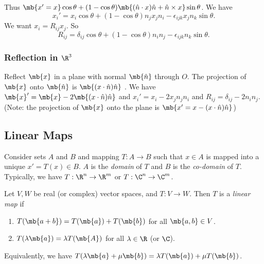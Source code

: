 \documentclass[a4paper]{article}
\begin{document}
Thus $\mb{x' = x}\cos\theta + (1 - \cos\theta)\mb{(\hat{n}\cdot x)\hat{n} + \hat{n}\times x}\sin\theta$. We have
\[
x_i' = x_i\cos\theta + (1 - \cos\theta)n_jx_jn_i - \epsilon_{ijk}x_jn_k\sin\theta.
\]
We want $x_i = R_{ij}x_j$. So
\[
R_{ij} = \delta_{ij}\cos\theta + (1 - \cos\theta)n_in_j - \epsilon_{ijk}n_k\sin\theta.
\]

\subsubsection{Reflection in \texorpdfstring{$\R^3$}{R3}}
Reflect $\mb{x}$ in a plane with normal $\mb{\hat{n}}$ through $O$. The projection of $\mb{x}$ onto $\mb{\hat{n}}$ is $\mb{(x\cdot \hat{n})\hat{n}}$ . We have $\mb{x}' = \mb{x} - 2\mb{(x\cdot \hat{n})\hat{n}}$ and $x_i' = x_i - 2x_jn_jn_i$ and $R_{ij} = \delta_{ij} - 2n_in_j$.(Note: the projection  of $\mb{x}$ onto the plane is $\mb{x' = x - (x\cdot \hat{n})\hat{n}}$)

\begin{center}
\end{center}

\subsection{Linear Maps}
\begin{defi}
  Consider sets $A$ and $B$ and mapping $T:A\to B$ such that $x\in A$ is mapped into a unique $x' = T(x)\in B$. $A$ is the \emph{domain} of $T$ and $B$ is the \emph{co-domain} of $T$. Typically, we have $T:\R^n \to \R^m$ or $T:\C^n\to \C^m$.
\end{defi}

\begin{defi}
  Let $V, W$ be real (or complex) vector spaces, and $T: V\to W$. Then $T$ is a \emph{linear map} if
  \begin{enumerate}
    \item $T(\mb{a + b}) = T(\mb{a}) + T(\mb{b})$ for all $\mb{a, b}\in V$.
    \item $T(\lambda\mb{a}) = \lambda T(\mb{A})$ for all $\lambda \in \R$ (or $\C$).
  \end{enumerate}
  Equivalently, we have $T(\lambda\mb{a} + \mu\mb{b}) = \lambda T(\mb{a}) + \mu T(\mb{b})$.
\end{defi}
\end{document}
